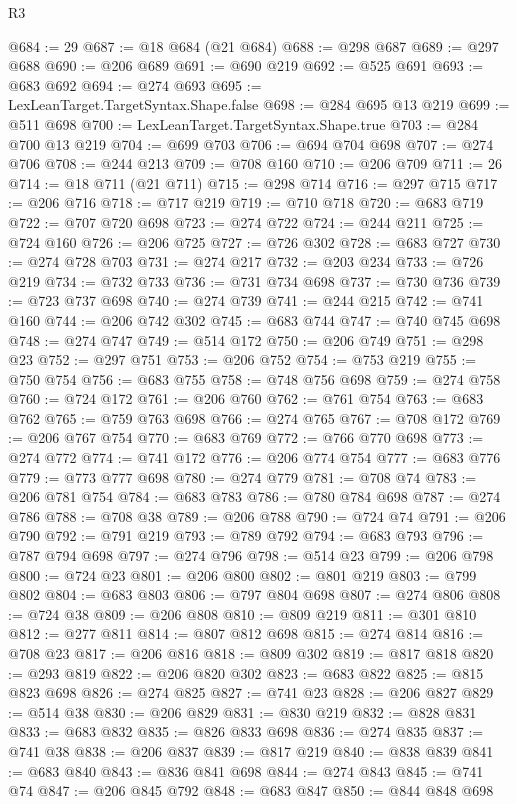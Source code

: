 \begin{lexlean}{R3}
\begin{coremodule}
@684 := 29
@687 := @18 @684 (@21 @684)
@688 := @298 @687
@689 := @297 @688
@690 := @206 @689
@691 := @690 @219
@692 := @525 @691
@693 := @683 @692
@694 := @274 @693
@695 := LexLeanTarget.TargetSyntax.Shape.false
@698 := @284 @695 @13 @219
@699 := @511 @698
@700 := LexLeanTarget.TargetSyntax.Shape.true
@703 := @284 @700 @13 @219
@704 := @699 @703
@706 := @694 @704 @698
@707 := @274 @706
@708 := @244 @213
@709 := @708 @160
@710 := @206 @709
@711 := 26
@714 := @18 @711 (@21 @711)
@715 := @298 @714
@716 := @297 @715
@717 := @206 @716
@718 := @717 @219
@719 := @710 @718
@720 := @683 @719
@722 := @707 @720 @698
@723 := @274 @722
@724 := @244 @211
@725 := @724 @160
@726 := @206 @725
@727 := @726 @302
@728 := @683 @727
@730 := @274 @728 @703
@731 := @274 @217
@732 := @203 @234
@733 := @726 @219
@734 := @732 @733
@736 := @731 @734 @698
@737 := @730 @736
@739 := @723 @737 @698
@740 := @274 @739
@741 := @244 @215
@742 := @741 @160
@744 := @206 @742 @302
@745 := @683 @744
@747 := @740 @745 @698
@748 := @274 @747
@749 := @514 @172
@750 := @206 @749
@751 := @298 @23
@752 := @297 @751
@753 := @206 @752
@754 := @753 @219
@755 := @750 @754
@756 := @683 @755
@758 := @748 @756 @698
@759 := @274 @758
@760 := @724 @172
@761 := @206 @760
@762 := @761 @754
@763 := @683 @762
@765 := @759 @763 @698
@766 := @274 @765
@767 := @708 @172
@769 := @206 @767 @754
@770 := @683 @769
@772 := @766 @770 @698
@773 := @274 @772
@774 := @741 @172
@776 := @206 @774 @754
@777 := @683 @776
@779 := @773 @777 @698
@780 := @274 @779
@781 := @708 @74
@783 := @206 @781 @754
@784 := @683 @783
@786 := @780 @784 @698
@787 := @274 @786
@788 := @708 @38
@789 := @206 @788
@790 := @724 @74
@791 := @206 @790
@792 := @791 @219
@793 := @789 @792
@794 := @683 @793
@796 := @787 @794 @698
@797 := @274 @796
@798 := @514 @23
@799 := @206 @798
@800 := @724 @23
@801 := @206 @800
@802 := @801 @219
@803 := @799 @802
@804 := @683 @803
@806 := @797 @804 @698
@807 := @274 @806
@808 := @724 @38
@809 := @206 @808
@810 := @809 @219
@811 := @301 @810
@812 := @277 @811
@814 := @807 @812 @698
@815 := @274 @814
@816 := @708 @23
@817 := @206 @816
@818 := @809 @302
@819 := @817 @818
@820 := @293 @819
@822 := @206 @820 @302
@823 := @683 @822
@825 := @815 @823 @698
@826 := @274 @825
@827 := @741 @23
@828 := @206 @827
@829 := @514 @38
@830 := @206 @829
@831 := @830 @219
@832 := @828 @831
@833 := @683 @832
@835 := @826 @833 @698
@836 := @274 @835
@837 := @741 @38
@838 := @206 @837
@839 := @817 @219
@840 := @838 @839
@841 := @683 @840
@843 := @836 @841 @698
@844 := @274 @843
@845 := @741 @74
@847 := @206 @845 @792
@848 := @683 @847
@850 := @844 @848 @698

\end{coremodule}
\end{lexlean}
